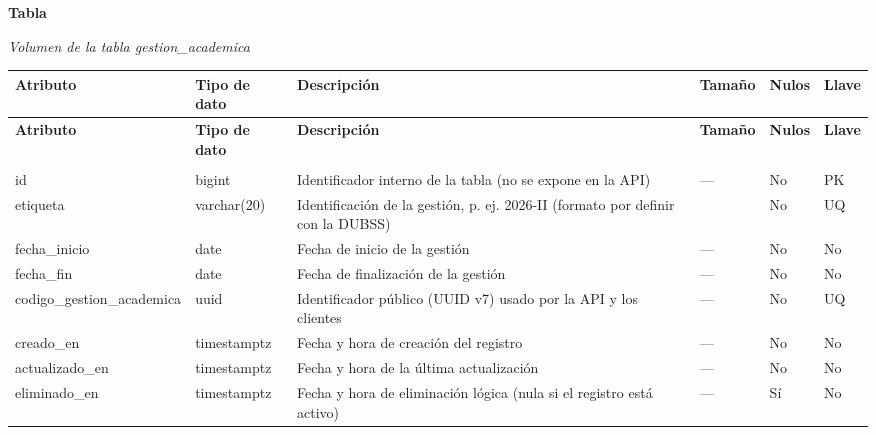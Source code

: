 \label{tab:volumen_gestion_academica}
\noindent\textbf{Tabla~\thetable}\par\nopagebreak
\noindent\textit{Volumen de la tabla gestion\_\allowbreak{}academica}\par\nopagebreak
\begingroup\small\linespread{1}\selectfont\setlength{\tabcolsep}{4pt}
\begin{longtable}{>{\raggedright\arraybackslash}p{3.4cm} >{\raggedright\arraybackslash}p{2.5cm} >{\raggedright\arraybackslash}p{4.8cm} >{\centering\arraybackslash}p{1.6cm}>{\centering\arraybackslash}p{1.1cm} >{\centering\arraybackslash}p{1.3cm}}
\toprule
\textbf{Atributo} & \textbf{Tipo de dato} & \textbf{Descripción} & \textbf{Tamaño} & \textbf{Nulos} & \textbf{Llave} \\
\midrule
\endfirsthead
\toprule
\textbf{Atributo} & \textbf{Tipo de dato} & \textbf{Descripción} & \textbf{Tamaño} & \textbf{Nulos} & \textbf{Llave} \\
\midrule
\endhead
\endfoot
\bottomrule
\multicolumn{6}{l}{\textit{Nota.} Elaboración propia.} \\
\endlastfoot
id & bigint & Identificador interno de la tabla (no se expone en la API) & — & No & PK \\
etiqueta & varchar(20) & Identificación de la gestión, p. ej. 2026-II (formato por definir con la DUBSS) & 20 & No & UQ \\
fecha\_\allowbreak{}inicio & date & Fecha de inicio de la gestión & — & No & No \\
fecha\_\allowbreak{}fin & date & Fecha de finalización de la gestión & — & No & No \\
codigo\_\allowbreak{}gestion\_\allowbreak{}academica & uuid & Identificador público (UUID v7) usado por la API y los clientes & — & No & UQ \\
creado\_\allowbreak{}en & timestamptz & Fecha y hora de creación del registro & — & No & No \\
actualizado\_\allowbreak{}en & timestamptz & Fecha y hora de la última actualización & — & No & No \\
eliminado\_\allowbreak{}en & timestamptz & Fecha y hora de eliminación lógica (nula si el registro está activo) & — & Sí & No \\
\end{longtable}
\endgroup
\addtocounter{table}{-1}

